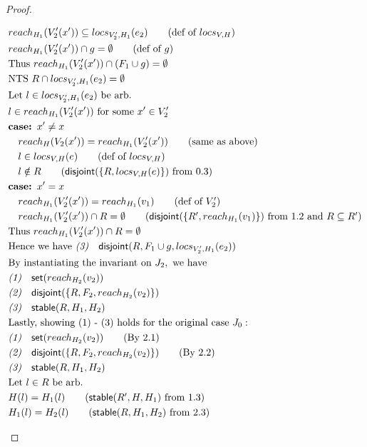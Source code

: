 \documentclass[11pt]{article}
\newcommand{\ms}[1]{\ensuremath{\mathsf{#1}}}
\newcommand{\stable}[1]{\mathsf{stable}(#1)}
\newcommand{\dist}[1]{\mathsf{disjoint}(#1)}
\theoremstyle{definition}
\begin{document}
\begin{proof}
\begin{description}
\begin{align*}
  &reach_{H_1}(V_2'(x')) \subseteq locs_{V_2',H_1}(e_2) \tag{def of $locs_{V,H}$}\\
  &reach_{H_1}(V_2'(x')) \cap g = \emptyset \tag{def of $g$}\\
  &\text{Thus } reach_{H_1}(V_2'(x')) \cap (F_1 \cup g) = \emptyset\\
  &\text{NTS } R \cap locs_{V_2',H_1}(e_2) = \emptyset\\
  &\text{Let } l \in locs_{V_2',H_1}(e_2) \text{ be arb.}\\
  &l \in reach_{H_1}(V_2'(x')) \text{ for some } x' \in V_2'\\
  &\textbf{case: } x' \ne x\\
  &\quad reach_H(V_2(x')) = reach_{H_1}(V_2'(x')) \tag{same as above}\\
  &\quad l \in locs_{V,H}(e) \tag{def of $locs_{V,H}$}\\
  &\quad l \notin R \tag{$\dist{\{R,locs_{V,H}(e)\}}$ from 0.3}\\
  &\textbf{case: } x' = x\\
  &\quad reach_{H_1}(V_2'(x')) = reach_{H_1}(v_1) \tag{def of $V_2'$}\\
  &\quad reach_{H_1}(V_2'(x')) \cap R = \emptyset \tag{$\dist{\{R', reach_{H_1}(v_1)\}}$ from 1.2 and $R \subseteq R'$}\\
  &\text{Thus } reach_{H_1}(V_2'(x')) \cap R = \emptyset\\
  &\text{Hence we have }\emph{(3)}\quad \dist{R,F_1 \cup g,locs_{V_2',H_1}(e_2)}\\
  &\text{By instantiating the invariant on } J_2, \text{ we have }\\
  &\emph{(1)}\quad \ms{set}(reach_{H_2}(v_2))\\
  &\emph{(2)}\quad \dist{\{R,F_2,reach_{H_2}(v_2)\}}\\
  &\emph{(3)}\quad \stable{R,H_1,H_2}\\
  &\text{Lastly, showing (1) - (3) holds for the original case } J_0:\\
  &\emph{(1)}\quad \ms{set}(reach_{H_2}(v_2)) \tag{By 2.1}\\
  &\emph{(2)}\quad \dist{\{R,F_2,reach_{H_2}(v_2)\}} \tag{By 2.2}\\
  &\emph{(3)}\quad \stable{R,H_1,H_2}\\
  &\text{Let } l \in R \text{ be arb. }\\
  &H(l) = H_1(l) \tag{$\stable{R',H,H_1}$ from 1.3}\\
  &H_1(l) = H_2(l) \tag{$\stable{R,H_1,H_2}$ from 2.3}\\

\end{align*}
\end{description}
\end{proof}
\end{document}
